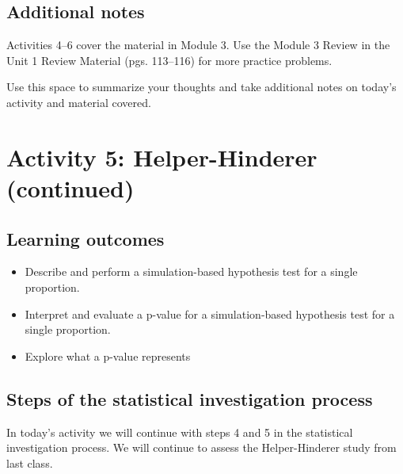 \documentclass[
]{report}
\begin{document}
\subsection{Additional notes}\label{additional-notes-3}

Activities 4--6 cover the material in Module 3. Use the Module 3 Review in the Unit 1 Review Material (pgs. 113--116) for more practice problems.

Use this space to summarize your thoughts and take additional notes on today's activity and material covered.

\newpage

\section{Activity 5: Helper-Hinderer (continued)}\label{activity-5-helper-hinderer-continued}


\subsection{Learning outcomes}\label{learning-outcomes-4}

\begin{itemize}
\item
  Describe and perform a simulation-based hypothesis test for a single proportion.
\item
  Interpret and evaluate a p-value for a simulation-based hypothesis test for a single proportion.
\item
  Explore what a p-value represents
\end{itemize}

\subsection{Steps of the statistical investigation process}\label{steps-of-the-statistical-investigation-process-2}

In today's activity we will continue with steps 4 and 5 in the statistical investigation process. We will continue to assess the Helper-Hinderer study from last class.
\end{document}

